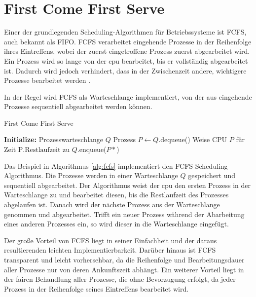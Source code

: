 
\section{First Come First Serve}

Einer der grundlegenden Scheduling-Algorithmen für Betriebssysteme ist \ac{FCFS}, auch bekannt als \ac{FIFO}. \ac{FCFS} verarbeitet eingehende Prozesse in der Reihenfolge ihres Eintreffens, wobei der zuerst eingetroffene Prozess zuerst abgearbeitet wird. Ein Prozess wird so lange von der \ac{cpu} bearbeitet, bis er vollständig abgearbeitet ist.
Dadurch wird jedoch verhindert, dass in der Zwischenzeit andere, wichtigere Prozesse  bearbeitet werden \cite[Kapitel 2.3.1.7]{ANTHONY201621}.

In der Regel wird \ac{FCFS} als Warteschlange implementiert, von der aus eingehende Prozesse sequentiell abgearbeitet werden können.

\begin{algorithm}
    \caption{First Come First Serve } \label{alg:fcfs}
    \begin{algorithmic}[1]
        \State \textbf{Initialize:} Prozesswarteschlange $Q$
        \State Prozess $P \gets Q$.dequeue()
        \State Weise CPU $P$ für Zeit $\text{P.Restlaufzeit}$ zu
        \State $Q$.enqueue($P*$)
        \EndIf
        \EndWhile
    \end{algorithmic}
\end{algorithm}


Das Beispiel in Algorithmus \ref{alg:fcfs} implementiert den \ac{FCFS}-Scheduling-Algorithmus. Die Prozesse werden in einer Warteschlange $Q$ gespeichert und sequentiell abgearbeitet. Der Algorithmus weist der \ac{cpu} den ersten Prozess in der Warteschlange zu und bearbeitet diesen, bis die Restlaufzeit des Prozesses abgelaufen ist. Danach wird der nächste Prozess aus der Warteschlange genommen und abgearbeitet. Trifft ein neuer Prozess während der Abarbeitung eines anderen Prozesses ein, so wird dieser in die Warteschlange eingefügt.

Der große Vorteil von \ac{FCFS} liegt in seiner Einfachheit und der daraus resultierenden leichten Implementierbarkeit. Darüber hinaus ist \ac{FCFS} transparent und leicht vorhersehbar, da die Reihenfolge und Bearbeitungsdauer aller Prozesse nur von deren Ankunftszeit abhängt. Ein weiterer Vorteil liegt in der fairen Behandlung aller Prozesse, die ohne Bevorzugung erfolgt, da jeder Prozess in der Reihenfolge seines Eintreffens bearbeitet wird.

